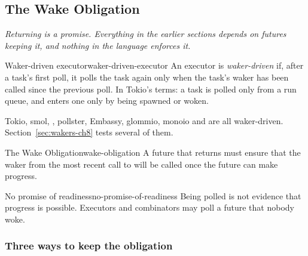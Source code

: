 
\subsection{The Wake Obligation}
\label{sec:wakers-ch7}

\textit{Returning  is a promise. Everything in the earlier sections depends on futures keeping it, and nothing in the language enforces it.}

\begin{definition}{Waker-driven executor}{waker-driven-executor}
    An executor is \emph{waker-driven} if, after a task's first poll, it polls the task again only when the task's waker has been called since the previous poll. In Tokio's terms: a task is polled only from a run queue, and enters one only by being spawned or woken.
\end{definition}

Tokio, smol, , pollster, Embassy, glommio, monoio and  are all waker-driven. Section~\ref{sec:wakers-ch8} tests several of them.

\begin{axiom}{The Wake Obligation}{wake-obligation}
    A future that returns  must ensure that the waker from the most recent call to  will be called once the future can make progress.
\end{axiom}

\begin{axiom}{No promise of readiness}{no-promise-of-readiness}
    Being polled is not evidence that progress is possible. Executors and combinators may poll a future that nobody woke.
\end{axiom}

\subsubsection{Three ways to keep the obligation}

